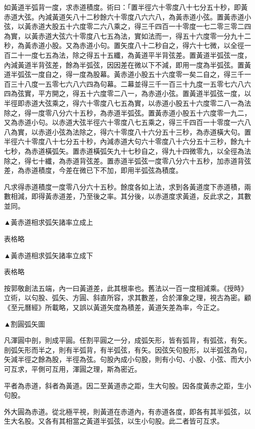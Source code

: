 如黃道半弧背一度，求赤道積度。術曰：「置半徑六十零度八十七分五十秒，即黃赤道大弦。內減黃道矢八十二秒餘六十零度八六六八，為黃赤道小弦。置黃赤道小弦，以黃赤道大股五十六度零二六八乘之，得三千四百一十零度一七二零三零二四為實，以黃赤道大弦六十零度八七五為法，實如法而一，得五十六度零一分九十二秒，為黃赤道小股。又為赤道小句。置矢度八十二秒自之，得六十七微，以全徑一百二十一度七五為法，除之得五十五纖，為黃道平半背弦差。置黃道半弧弦一度，內減黃道半背弦差，餘為半弧弦，因因差在微以下不減，即用一度為半弧弦。置黃道半弧弦一度自之，得一度為股幕。黃赤道小股五十六度零一矣二自之，得三千一百三十八度一五零七六八六四為句幕。二幕並得三千一百三十九度一五零七六八六四為弦實，平方開之，得五十六度零二八一，為赤道小弦。置黃道半弧弦一度，以半徑即赤道大弦乘之，得六十零度八七五為實，以赤道小股五十六度零二八一為法除之，得一度零八分六十五秒，為赤道半弧弦。置黃赤道小股五十六度零一九二，又為赤道小句。以赤道大弦半徑六十零度八七五乘之，得三千四百一十零度一六八八為實，以赤道小弦為法除之，得六十零度八十六分五十三秒，為赤道橫大句。置半徑六十零度八十七分五十秒，內減赤道大句六十零度八十六分五十三秒，餘九十七秒，為赤道橫弧矢。置赤道橫弧矢九十七秒自之，得九十四微零九，以全徑為法除之，得七十纖，為赤道背弦差。置赤道半弧弦一度零八分六十五秒，加赤道背弦差，為赤道積度，今差在微已下不加，即用半弧弦為積度。

凡求得赤道積度一度零八分六十五秒。餘度各如上法，求到各黃道度下赤道積，兩數相減，即得黃赤道差，乃至後之率。其分後，以赤道度求黃道，反此求之，其數並同。

▲黃赤道相求弧矢諸率立成上

表格略

▲黃赤道相求弧矢諸率立成下

表格略

按郭敬創法五端，內一曰黃道差，此其根率也。舊法以一百一度相減乘。《授時》立術，以句股、弧矢、方圓、斜直所容，求其數差，合於渾象之理，視古為密。顧《至元曆經》所載略，又誤以黃道矢度為積差，黃道矢差為率，今正之。

▲割圓弧矢圖

凡渾圓中剖，則成平圓。任割平圓之一分，成弧矢形，皆有弧背，有弧弦，有矢。剖弧矢形而半之，則有半弧背，有半弧弦，有矢。因弦矢句股形，以半弧弦為句，矢減半徑之餘為股，半徑為弦。句股內成小句股，則有小句、小股、小弦、而大小可互求，平側可互用，渾圓之理，斯為密近。

平者為赤道，斜者為黃道。因二至黃道赤之距，生大句股。因各度黃赤之距，生小句股。

外大圓為赤道。從北極平視，則黃道在赤道內，有赤道各度，即各有其半弧弦，以生大名股。又各有其相當之黃道半弧弦，以生小句股。此二者皆可互求。

